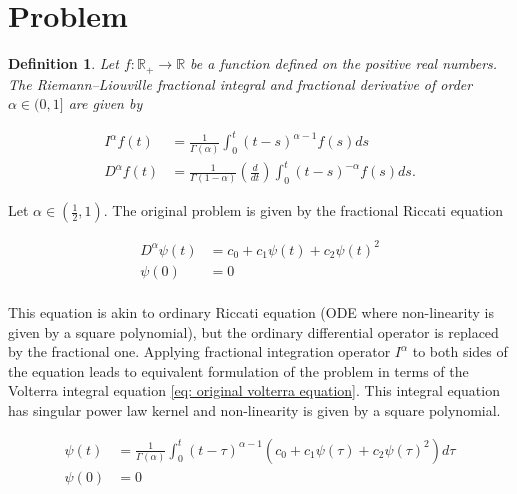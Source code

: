 \documentclass[12pt]{article}
\theoremstyle{plain}
\newtheorem{definition}[proposition]{Definition}
\begin{document}
\section{Problem}

\begin{definition}

Let $f: \mathbb R_+\rightarrow \mathbb R$ be a function defined on the positive real numbers. The \emph{Riemann–Liouville fractional integral} and \emph{fractional derivative} of order $\alpha\in(0, 1]$ are given by

$$
\begin{aligned}
I^{\alpha} f(t)&=\frac{1}{\Gamma(\alpha)} \int_{0}^{t}(t-s)^{\alpha-1} f(s) ds \\[10pt]
D^{\alpha} f(t)&=\frac{1}{\Gamma(1-\alpha)}\left( \frac{d}{d t} \right) \int_{0}^{t}(t-s)^{-\alpha} f(s) d s.
\end{aligned}
$$

\end{definition}

\vspace{10pt}

Let $\alpha \in \left(\frac 12, 1\right)$. The original problem is given by the fractional Riccati equation

\begin{equation}
\label{eq: fractional riccati formulation}
\begin{aligned}
D^\alpha\psi(t) &= c_0+c_1 \psi(t)+c_2 \psi(t)^{2}\\
\psi(0) &= 0 \\[10pt]
\end{aligned}
\end{equation}

This equation is akin to ordinary Riccati equation (ODE where non-linearity is given by a square polynomial), but the ordinary differential operator is replaced by the fractional one. Applying fractional integration operator $I^\alpha$ to both sides of the equation leads to equivalent formulation of the problem in terms of the Volterra integral equation \eqref{eq: original volterra equation}. This integral equation has singular power law kernel and non-linearity is given by a square polynomial.

\begin{equation}
\label{eq: original volterra equation}
\begin{aligned}
\psi(t) &= \frac{1}{\Gamma(\alpha)} \int _0^t (t-\tau)^{\alpha-1} (c_0+c_1 \psi(\tau)+c_2 \psi(\tau)^{2}) d\tau\\
\psi(0) &= 0 \\
\end{aligned}
\end{equation}
\end{document}

